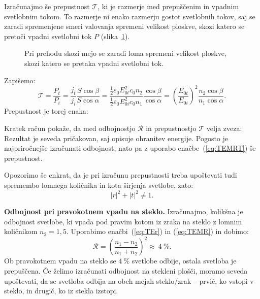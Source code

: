 Izračunajmo še prepustnost $\mathcal{T}$, ki je razmerje med prepuščenim in vpadnim svetlobnim
tokom. To razmerje ni enako razmerju gostot svetlobnih tokov, saj se zaradi
spremenjene smeri valovanja spremeni velikost ploskve, skozi
katero se pretoči vpadni svetlobni tok $P$ (slika~\ref{fig:04_coscos}).
\begin{figure}[ht]
\centering
\def\svgwidth{60truemm} 

\caption{Pri prehodu skozi mejo se zaradi loma spremeni velikost
ploskve, skozi katero se pretaka vpadni svetlobni tok.}
\label{fig:04_coscos}
\end{figure}

Zapišemo: 
\begin{equation}
\mathcal{T} = \frac{P_t}{P_i} = \frac{j_t}{j_i}\frac{S\cos \beta}{S\cos \alpha} =
\frac{\frac{1}{2}\varepsilon_0 E_{0t}^2 c_0 n_2}
{\frac{1}{2}\varepsilon_0 E_{0i}^2 c_0 n_1} \frac{\cos\beta}{\cos\alpha}= 
\left(\frac{E_{0t}}{E_{0i}}\right)^2 \frac{n_2\cos\beta}{n_1\cos\alpha}.
\label{eq:04_46}
\end{equation}
Prepustnost je torej enaka:

Kratek  račun pokaže, da med odbojnostjo $\mathcal{R}$ in prepustnostjo $\mathcal{T}$ velja zveza:
Rezultat je seveda pričakovan, saj opisuje ohranitev energije. Pogosto je najpriročnejše
izračunati odbojnost, nato pa z uporabo enačbe~(\ref{eq:TEMRT}) še prepustnost. 

Opozorimo še enkrat, da je pri izračunu prepustnosti treba upoštevati tudi 
spremembo lomnega količnika in kota širjenja svetlobe, zato:
\begin{equation}
|r|^2+ |t|^2 \neq 1.
\label{eq:04_48}
\end{equation}

\begin{example}{\bf Odbojnost pri pravokotnem vpadu na steklo.} 
Izračunajmo, kolikšna je odbojnost svetlobe, ki vpada pod pravim kotom iz zraka na
steklo z lomnim količnikom $n_2=1,5$. Uporabimo enačbi~(\ref{eq:TEr}) in (\ref{eq:TEMR})
in dobimo:
\begin{equation}
\mathcal{R} = \left(\frac{n_1-n_2}{n_1+n_2}\right)^2 \approx~4~\%.
\label{eq:04_49}
\end{equation}
Ob pravokotnem vpadu na steklo se $4~\%$ svetlobe odbije, ostala 
svetloba je prepuščena. Če želimo izračunati odbojnost na stekleni plošči, 
moramo seveda upoštevati, da se svetloba odbija
na obeh mejah steklo/zrak -- prvič, ko vstopi v steklo, in drugič, ko iz stekla
izstopi.
\end{example}

